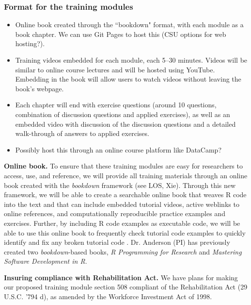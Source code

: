 \documentclass[pdftex,english,11pt,parskip=half]{scrartcl}
\begin{document}






\subsubsection*{Format for the training modules}

\begin{itemize}
\item Online book created through the ``bookdown" format, with each module as a book chapter. We can use Git Pages to host this (CSU options for web hosting?).
\item Training videos embedded for each module, each 5--30 minutes. Videos will be similar to online course lectures and will be hosted using YouTube. Embedding in the book will allow users to watch videos without leaving the book's webpage. 
\item Each chapter will end with exercise questions (around 10 questions, combination of discussion questions and applied exercises), as well as an embedded video with discussion of the discussion questions and a detailed walk-through of answers to applied exercises. 
\item Possibly host this through an online course platform like DataCamp?
\end{itemize}

\textbf{Online book.} To ensure that these training modules are easy for researchers to access, use, and reference, we will provide all training materials through an online book created with the \textit{bookdown} framework \cite{xie2016bookdown} (see LOS, Xie). Through this new framework, we will be able to create a searchable online book that weaves R code into the text and that can include embedded tutorial videos, active weblinks to online references, and computationally reproducible practice examples and exercises. Further, by including R code examples as executable code, we will be able to use this online book to frequently check tutorial code examples to quickly identify and fix any broken tutorial code \cite{xie2016bookdown}.  Dr. Anderson (PI) has previously created two \textit{bookdown}-based books, \textit{R Programming for Research} and \textit{Mastering Software Development in R}.  

\noindent \textbf{Insuring compliance with Rehabilitation Act.} We have plans for making our proposed training module section 508 compliant of the Rehabilitation Act (29 U.S.C. '794 d), as amended by the Workforce Investment Act of 1998.
\end{document}
